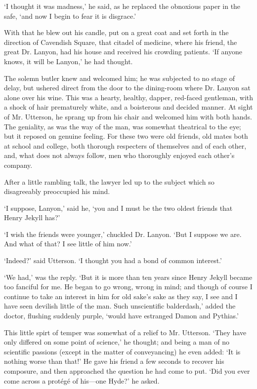 \documentclass[]{novel}
\begin{document}
‘I thought it was madness,’ he said, as he replaced the obnoxious paper in the safe, ‘and now I begin to fear it is disgrace.’

With that he blew out his candle, put on a great coat and set forth in the direction of Cavendish Square, that citadel of medicine, where his friend, the great Dr. Lanyon, had his house and received his crowding patients. ‘If anyone knows, it will be Lanyon,’ he had thought.

The solemn butler knew and welcomed him; he was subjected to no stage of delay, but ushered direct from the door to the dining-room where Dr. Lanyon sat alone over his wine. This was a hearty, healthy, dapper, red-faced gentleman, with a shock of hair prematurely white, and a boisterous and decided manner. At sight of Mr. Utterson, he sprang up from his chair and welcomed him with both hands. The geniality, as was the way of the man, was somewhat theatrical to the eye; but it reposed on genuine feeling. For these two were old friends, old mates both at school and college, both thorough respecters of themselves and of each other, and, what does not always follow, men who thoroughly enjoyed each other’s company.

After a little rambling talk, the lawyer led up to the subject which so disagreeably preoccupied his mind.

‘I suppose, Lanyon,’ said he, ‘you and I must be the two oldest friends that Henry Jekyll has?’

‘I wish the friends were younger,’ chuckled Dr. Lanyon. ‘But I suppose we are. And what of that? I see little of him now.’

‘Indeed?’ said Utterson. ‘I thought you had a bond of common interest.’

‘We had,’ was the reply. ‘But it is more than ten years since Henry Jekyll became too fanciful for me. He began to go wrong, wrong in mind; and though of course I continue to take an interest in him for old sake’s sake as they say, I see and I have seen devilish little of the man. Such unscientific balderdash,’ added the doctor, flushing suddenly purple, ‘would have estranged Damon and Pythias.’

This little spirt of temper was somewhat of a relief to Mr. Utterson. ‘They have only differed on some point of science,’ he thought; and being a man of no scientific passions (except in the matter of conveyancing) he even added: ‘It is nothing worse than that!’ He gave his friend a few seconds to recover his composure, and then approached the question he had come to put. ‘Did you ever come across a protégé of his—one Hyde?’ he asked.
\end{document}
